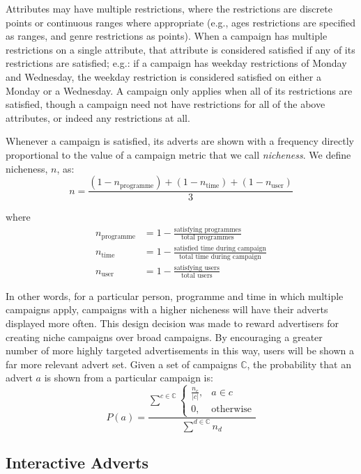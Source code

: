 	Attributes may have multiple restrictions, where the restrictions are discrete points or continuous ranges where appropriate (e.g., ages restrictions are specified as ranges, and genre restrictions as points). When a campaign has multiple restrictions on a single attribute, that attribute is considered satisfied if any of its restrictions are satisfied; e.g.: if a campaign has weekday restrictions of Monday and Wednesday, the weekday restriction is considered satisfied on either a Monday or a Wednesday. A campaign only applies when all of its restrictions are satisfied, though a campaign need not have restrictions for all of the above attributes, or indeed any restrictions at all.

	Whenever a campaign is satisfied, its adverts are shown with a frequency directly proportional to the value of a campaign metric that we call \textit{nicheness}. We define nicheness, $n$, as:
	$$
		n = \frac{(1-n_\text{programme}) + (1-n_\text{time}) + (1-n_\text{user})}{3}
	$$

	where
	\begin{align*}
		n_\text{programme} &= 1 - \frac{\text{satisfying programmes}}{\text{total programmes}} \\
		n_\text{time} &= 1 - \frac{\text{satisfied time during campaign}}{\text{total time during campaign}} \\
		n_\text{user} &= 1 - \frac{\text{satisfying users}}{\text{total users}}
	\end{align*}

	In other words, for a particular person, programme and time in which multiple campaigns apply, campaigns with a higher nicheness will have their adverts displayed more often. This design decision was made to reward advertisers for creating niche campaigns over broad campaigns. By encouraging a greater number of more highly targeted advertisements in this way, users will be shown a far more relevant advert set. Given a set of campaigns $\mathbb{C}$, the probability that an advert $a$ is shown from a particular campaign is:
	$$
		P(a) =
		\frac{
			\displaystyle \sum^{c \in \mathbb{C}}
			\begin{cases}
				\frac{n_c}{\left|c\right|}, & a \in c \\
				0, & \text{otherwise}
			\end{cases}
		}{
			\displaystyle \sum^{d \in \mathbb{C}} n_d
		}
	$$

\subsection{Interactive Adverts}


